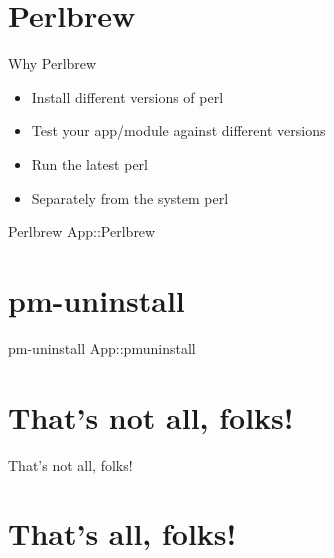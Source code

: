 \documentclass[
	mode=present,
	style=paintings,
	size=14pt,
	paper=screen
]{powerdot}
\begin{document}
\section{Perlbrew}
\begin{slide}{Why Perlbrew}
        \begin{itemize}
          \item Install different versions of perl \par
          \item Test your app/module against different versions \par
          \item Run the latest perl \par
          \item Separately from the system perl
        \end{itemize}
\end{slide}
\begin{slide}{Perlbrew}
	App::Perlbrew
\end{slide}
\section{pm-uninstall}
\begin{slide}{pm-uninstall}
	App::pmuninstall\par
\end{slide}
\section{That's not all, folks!}
\begin{slide}{That's not all, folks!}
	\par
	\par
	\par
	\par
	\par
	\par
	\par
	\par
\end{slide}
\section {That's all, folks!}
\end{document}
